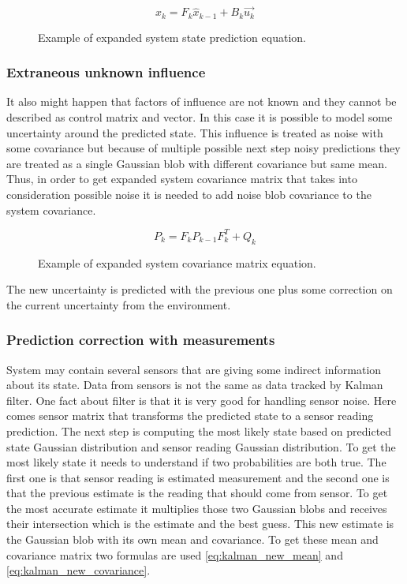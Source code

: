 \documentclass[../../main]{subfiles}
\begin{document}
\begin{figure} [!ht]
  \centering    
    \begin{equation}
       \hat{x_k} = F_k \hat{x}_{k-1} + B_k\vec{u_k}
    \end{equation}
  \caption{Example of expanded system state prediction equation.}
\end{figure}

\subsubsection*{Extraneous unknown influence}

It also might happen that factors of influence are not known and they cannot be described as control matrix and vector. In this case it is possible to model some uncertainty around the predicted state. This influence is treated as noise with some covariance but because of multiple possible next step noisy predictions they are treated as a single Gaussian blob with different covariance but same mean.
Thus, in order to get expanded system covariance matrix that takes into consideration possible noise it is needed to add noise blob covariance to the system covariance.

\begin{figure} [!ht]
  \centering    
    \begin{equation}
       P_k = F_k P_{k-1}  F_k^T + Q_k
    \end{equation}
  \caption{Example of expanded system covariance matrix equation.}
\end{figure}

The new uncertainty is predicted with the previous one plus some correction on the current uncertainty from the environment.

\subsubsection*{Prediction correction with measurements}

System may contain several sensors that are giving some indirect information about its state. Data from sensors is not the same as data tracked by Kalman filter. One fact about filter is that it is very good for handling sensor noise.
Here comes sensor matrix that transforms the predicted state to a sensor reading prediction. The next step is computing the most likely state based on predicted state Gaussian distribution and sensor reading Gaussian distribution. To get the most likely state it needs to understand if two probabilities are both true. The first one is that sensor reading is estimated measurement and the second one is that the previous estimate is the reading that should come from sensor. To get the most accurate estimate it multiplies those two Gaussian blobs and receives their intersection which is the estimate and the best guess. This new estimate is the Gaussian blob with its own mean and covariance. To get these mean and covariance matrix two formulas are used \ref{eq:kalman_new_mean} and \ref{eq:kalman_new_covariance}.
\end{document}
